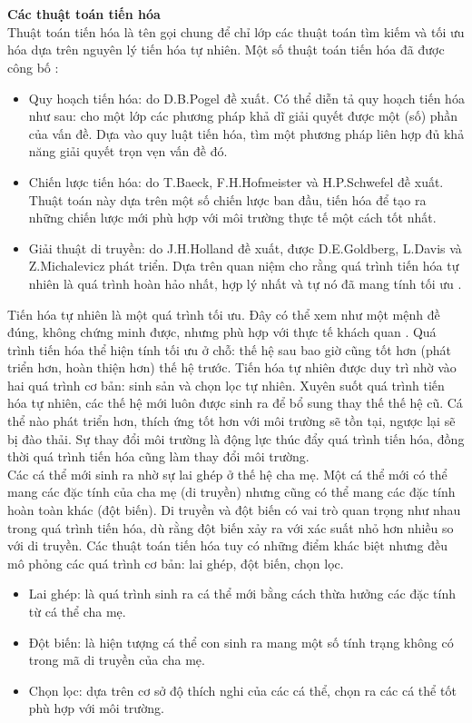 \\ \\\textbf{Các thuật toán tiến hóa }
\\Thuật toán tiến hóa là tên gọi chung để chỉ lớp các thuật toán tìm kiếm và tối ưu hóa dựa trên nguyên lý tiến hóa tự nhiên. Một số thuật toán tiến hóa đã được công bố \cite{lap_trinh_tien_hoa}:
\begin{itemize}
    \item Quy hoạch tiến hóa: do D.B.Pogel đề xuất. Có thể diễn tả quy hoạch tiến hóa như sau: cho một lớp các phương pháp khả dĩ giải quyết được một (số) phần của vấn đề. Dựa vào quy luật tiến hóa, tìm một phương pháp liên hợp đủ khả năng giải quyết trọn vẹn vấn đề đó.
    \item Chiến lược tiến hóa: do T.Baeck, F.H.Hofmeister và H.P.Schwefel đề xuất. Thuật toán này dựa trên một số chiến lược ban đầu, tiến hóa để tạo ra những chiến lược mới phù hợp với môi trường thực tế một cách tốt nhất.
    \item Giải thuật di truyền: do J.H.Holland đề xuất, được D.E.Goldberg, L.Davis và Z.Michalevicz phát triển. Dựa trên quan niệm cho rằng quá trình tiến hóa tự nhiên là quá trình hoàn hảo nhất, hợp lý nhất và tự nó đã mang tính tối ưu \cite{lap_trinh_tien_hoa}.
\end{itemize}
Tiến hóa tự nhiên là một quá trình tối ưu. Đây có thể xem như một mệnh đề đúng, không chứng minh được, nhưng phù hợp với thực tế khách quan \cite{lap_trinh_tien_hoa}. Quá trình tiến hóa thể hiện tính tối ưu ở chỗ: thế hệ sau bao giờ cũng tốt hơn (phát triển hơn, hoàn thiện hơn) thế hệ trước. Tiến hóa tự nhiên được duy trì nhờ vào hai quá trình cơ bản: sinh sản và chọn lọc tự nhiên. Xuyên suốt quá trình tiến hóa tự nhiên, các thế hệ mới luôn được sinh ra để bổ sung thay thế thế hệ cũ. Cá thể nào phát triển hơn, thích ứng tốt hơn với môi trường sẽ tồn tại, ngược lại sẽ bị đào thải. Sự thay đổi môi trường là động lực thúc đẩy quá trình tiến hóa, đồng thời quá trình tiến hóa cũng làm thay đổi môi trường.
\\Các cá thể mới sinh ra nhờ sự lai ghép ở thế hệ cha mẹ. Một cá thể mới có thể mang các đặc tính của cha mẹ (di truyền) nhưng cũng có thể mang các đặc tính hoàn toàn khác (đột biến). Di truyền và đột biến có vai trò quan trọng như nhau trong quá trình tiến hóa, dù rằng đột biến xảy ra với xác suất nhỏ hơn nhiều so với di truyền. Các thuật toán tiến hóa tuy có những điểm khác biệt nhưng đều mô phỏng các quá trình cơ bản: lai ghép, đột biến, chọn lọc.
\begin{itemize}
    \item Lai ghép: là quá trình sinh ra cá thể mới bằng cách thừa hưởng các đặc tính từ cá thể cha mẹ.
    \item Đột biến: là hiện tượng cá thể con sinh ra mang một số tính trạng không có trong mã di truyền của cha mẹ.
    \item Chọn lọc: dựa trên cơ sở độ thích nghi của các cá thể, chọn ra các cá thể tốt phù hợp với môi trường.
\end{itemize}
